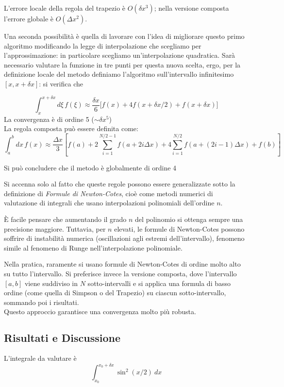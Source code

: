 \indent L’errore locale della regola del trapezio è $O(\delta x^3)$; nella versione composta l’errore globale è $O(\Delta x^2)$.

\bigskip\noindent
Una seconda possibilità è quella di lavorare con l'idea di migliorare questo primo algoritmo modificando la legge di interpolazione che scegliamo per l'approssimazione: in particolare scegliamo un'interpolazione quadratica. Sarà necessario valutare la funzione in tre punti per questa nuova scelta, ergo, per la definizione locale del metodo definiamo l'algoritmo sull'intervallo infinitesimo $[x, x+\delta x]$: si verifica che

\begin{equation*}
    \int_x^{x+ \delta x} d\xi \, f(\xi) \approx \frac{\delta x}{6} \big[f(x) + 4 f(x + \delta x/2) + f(x+\delta x) \big]
\end{equation*}
\indent La convergenza è di ordine 5 ($\sim \delta x^5$)\\

\noindent La regola composta può essere definita come:
\[
    \int_a^b dx \, f(x) \approx \frac{\Delta x}{3} \left[ f(a) + 2 \sum_{i=1}^{N/2-1} f(a + 2i \Delta x) + 4 \sum_{i=1}^{N/2} f(a + (2i-1)\Delta x) + f(b) \right]
\]

Si può concludere che il metodo è globalmente di ordine 4

\bigskip\noindent
Si accenna solo al fatto che queste regole possono essere generalizzate sotto la definizione di \textit{Formule di Newton-Cotes}, cioè come metodi numerici di valutazione di integrali che usano interpolazioni polinomiali dell'ordine $n$.

È facile pensare che aumentando il grado $n$ del polinomio si ottenga sempre una precisione maggiore. Tuttavia, per $n$ elevati, le formule di Newton-Cotes possono soffrire di instabilità numerica (oscillazioni agli estremi dell'intervallo), fenomeno simile al fenomeno di Runge nell'interpolazione polinomiale.

Nella pratica, raramente si usano formule di Newton-Cotes di ordine molto alto su tutto l'intervallo. Si preferisce invece la versione composta, dove l'intervallo $[a, b]$ viene suddiviso in $N$ sotto-intervalli e si applica una formula di basso ordine (come quella di Simpson o del Trapezio) su ciascun sotto-intervallo, sommando poi i risultati.\\
Questo approccio garantisce una convergenza molto più robusta.

\subsection{Risultati e Discussione}
L'integrale da valutare è 
\[
\int_{x_0}^{x_0 + \delta x} \sin^2(x/2)\ dx
\]

